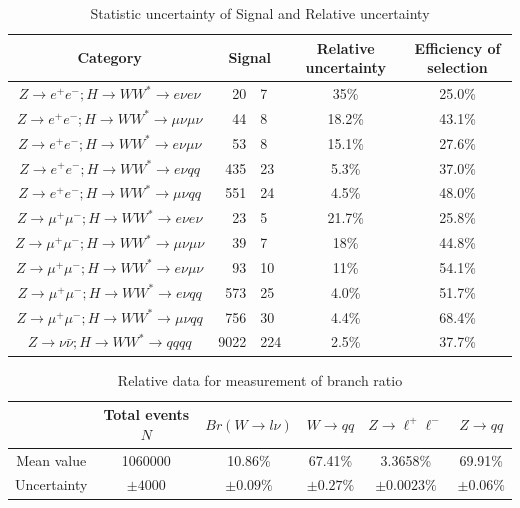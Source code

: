 \documentclass[11pt,a4paper]{cepcnote}
\begin{document}
\begin{table}[H]
  \begin{center}
    \begin{tabular}{cr@{$\pm$}lcc}
      \hline \hline
      Category      &\multicolumn{2}{c}{Signal}& \multicolumn{1}{c}{Relative uncertainty} & \multicolumn{1}{c}{Efficiency of selection}\\ 
      \hline
      $Z\rightarrow e^+e^-; H\rightarrow WW^*\rightarrow e\nu e\nu			$	&20    &7	&35\%   &25.0\%\\
      $Z\rightarrow e^+e^-; H\rightarrow WW^*\rightarrow \mu\nu\mu\nu		$	&44    &8	&18.2\%	&43.1\%\\ 
      $Z\rightarrow e^+e^-; H\rightarrow WW^*\rightarrow e\nu\mu\nu			$	&53    &8	&15.1\% &27.6\%\\
	  $Z\rightarrow e^+e^-; H\rightarrow WW^*\rightarrow e\nu qq			$	&435   &23  &5.3\%  &37.0\%\\
	  $Z\rightarrow e^+e^-; H\rightarrow WW^*\rightarrow \mu\nu qq			$	&551   &24	&4.5\%  &48.0\%\\
      $Z\rightarrow \mu^+\mu^-; H\rightarrow WW^*\rightarrow e\nu e\nu		$	&23    &5	&21.7\% &25.8\%\\
      $Z\rightarrow \mu^+\mu^-; H\rightarrow WW^*\rightarrow \mu\nu\mu\nu	$	&39    &7	&18\%	&44.8\%\\ 
      $Z\rightarrow \mu^+\mu^-; H\rightarrow WW^*\rightarrow e\nu\mu\nu		$	&93    &10	&11\%   &54.1\%\\
	  $Z\rightarrow \mu^+\mu^-; H\rightarrow WW^*\rightarrow e\nu qq		$	&573   &25  &4.0\%  &51.7\%\\
	  $Z\rightarrow \mu^+\mu^-; H\rightarrow WW^*\rightarrow \mu\nu qq		$	&756   &30	&4.4\%  &68.4\%\\
	  $Z\rightarrow \nu\bar{\nu}; H\rightarrow WW^*\rightarrow qqqq			$	&9022  &224	&2.5\%  &37.7\%\\
      \hline \hline
    \end{tabular}
  \caption{Statistic uncertainty of Signal and Relative uncertainty}
  \label{tab:fullstatistic}
  \end{center}
\end{table}
\begin{table}[H]
\begin{center}
\begin{tabular}{cccccc}
\hline\hline
			&	Total events $N$ &	$Br(W\rightarrow l\nu)$  &  $W\rightarrow qq$  &  $Z\rightarrow \ell^+\ell^-$  &  $Z\rightarrow qq$  \\
\hline
Mean value	&	1060000			 &  10.86\%					 &  67.41\%			   &  3.3658\%				  &  69.91\%			\\
Uncertainty	&	$\pm4000$		 &	$\pm0.09\%$				 &  $\pm0.27\%$		   &  $\pm0.0023\%$			  &  $\pm0.06\%$			\\
\hline\hline
\end{tabular}
\caption[]{Relative data for measurement of branch ratio}
\label{tab:relativeresult}
\end{center}
\end{table}
\end{document}
